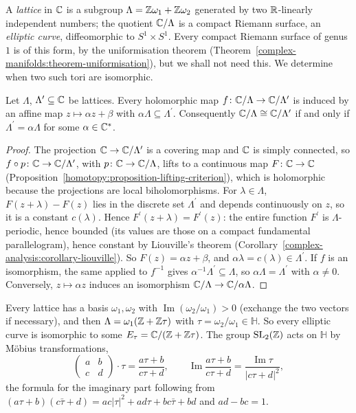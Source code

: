 A \emph{lattice} in $\mathbb{C}$ is a subgroup $\Lambda = \mathbb{Z}\omega_1 + \mathbb{Z}\omega_2$ generated by two $\mathbb{R}$-linearly independent numbers; the quotient $\mathbb{C}/\Lambda$ is a compact Riemann surface, an \emph{elliptic curve},
diffeomorphic to $S^1 \times S^1$. Every compact Riemann surface of genus $1$ is of this form, by the uniformisation theorem (Theorem~\ref{complex-manifolds:theorem-uniformisation}), but we shall not need this.
We determine when two such tori are isomorphic.

\begin{proposition}\label{deformations:proposition-tori-isomorphic}
Let $\Lambda$, $\Lambda^{\prime} \subseteq \mathbb{C}$ be lattices. Every holomorphic map $f \colon \mathbb{C}/\Lambda \to \mathbb{C}/\Lambda^{\prime}$ is induced by an affine map $z \mapsto \alpha z + \beta$ with $\alpha\Lambda \subseteq \Lambda^{\prime}$.
Consequently $\mathbb{C}/\Lambda \cong \mathbb{C}/\Lambda^{\prime}$ if and only if $\Lambda^{\prime} = \alpha\Lambda$ for some $\alpha \in \mathbb{C}^*$.
\end{proposition}

\begin{proof}
The projection $\mathbb{C} \to \mathbb{C}/\Lambda^{\prime}$ is a covering map and $\mathbb{C}$ is simply connected, so $f \circ p \colon \mathbb{C} \to \mathbb{C}/\Lambda^{\prime}$, with $p \colon \mathbb{C} \to \mathbb{C}/\Lambda$, lifts to a continuous map
$F \colon \mathbb{C} \to \mathbb{C}$ (Proposition~\ref{homotopy:proposition-lifting-criterion}), which is holomorphic because the projections are local biholomorphisms. For $\lambda \in \Lambda$, $F(z + \lambda) - F(z)$ lies in
the discrete set $\Lambda^{\prime}$ and depends continuously on $z$, so it is a constant $c(\lambda)$. Hence $F^{\prime}(z + \lambda) = F^{\prime}(z)$: the entire function $F^{\prime}$ is $\Lambda$-periodic, hence bounded
(its values are those on a compact fundamental parallelogram), hence constant by Liouville's theorem (Corollary~\ref{complex-analysis:corollary-liouville}). So $F(z) = \alpha z + \beta$, and
$\alpha\lambda = c(\lambda) \in \Lambda^{\prime}$. If $f$ is an isomorphism, the same applied to $f^{-1}$ gives $\alpha^{-1}\Lambda^{\prime} \subseteq \Lambda$, so $\alpha\Lambda = \Lambda^{\prime}$ with $\alpha \neq 0$. Conversely,
$z \mapsto \alpha z$ induces an isomorphism $\mathbb{C}/\Lambda \to \mathbb{C}/\alpha\Lambda$.
\end{proof}

Every lattice has a basis $\omega_1, \omega_2$ with $\operatorname{Im}(\omega_2/\omega_1) > 0$ (exchange the two vectors if necessary), and then $\Lambda = \omega_1(\mathbb{Z} + \mathbb{Z}\tau)$ with $\tau = \omega_2/\omega_1 \in \mathbb{H}$.
So every elliptic curve is isomorphic to some $E_\tau = \mathbb{C}/(\mathbb{Z} + \mathbb{Z}\tau)$. The group $\mathrm{SL}_2(\mathbb{Z})$ acts on $\mathbb{H}$ by Möbius transformations,
\[
\begin{pmatrix}a & b\\ c & d\end{pmatrix}\cdot\tau = \frac{a\tau + b}{c\tau + d}, \qquad \operatorname{Im}\frac{a\tau + b}{c\tau + d} = \frac{\operatorname{Im}\tau}{|c\tau + d|^2},
\]
the formula for the imaginary part following from $(a\tau + b)(c\bar\tau + d) = ac|\tau|^2 + ad\tau + bc\bar\tau + bd$ and $ad - bc = 1$.

